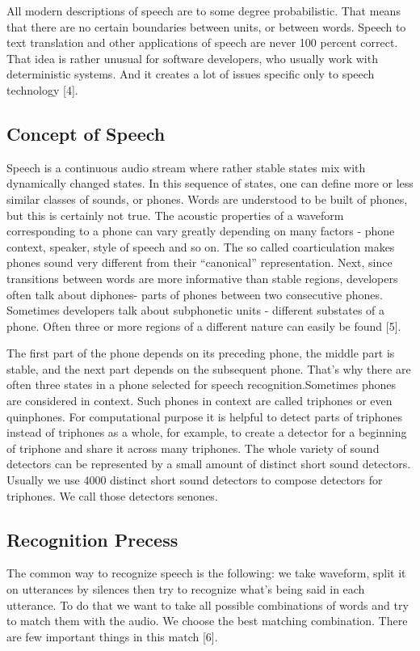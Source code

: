 \documentclass[12pt,a4paper,oneside]{memoir}
\begin{document}
All modern descriptions of speech are to some degree probabilistic. That means that there are no certain boundaries between units, or between words. Speech to text translation and other applications of speech are never 100 percent correct. That idea is rather unusual for software developers, who usually work with deterministic systems. And it creates a lot of issues specific only to speech technology [4]. 


\subsection{Concept of Speech}
Speech is a continuous audio stream where rather stable states mix with dynamically changed states. In this sequence of states, one can define more or less similar classes of sounds, or phones. Words are understood to be built of phones, but this is certainly not true. The acoustic properties of a waveform corresponding to a phone can vary greatly depending on many factors - phone context, speaker, style of speech and so on. The so called coarticulation makes phones sound very different from their “canonical” representation. Next, since transitions between words are more informative than stable regions, developers often talk about diphones- parts of phones between two consecutive phones. Sometimes developers talk about subphonetic units - different substates of a phone. Often three or more regions of a different nature can easily be found [5].

The first part of the phone depends on its preceding phone, the middle part is stable, and the next part depends on the subsequent phone. That's why there are often three states in a phone selected for speech recognition.Sometimes phones are considered in context. Such phones in context are called triphones or even quinphones. For computational purpose it is helpful to detect parts of triphones instead of triphones as a whole, for example, to create a detector for a beginning of triphone and share it across many triphones. The whole variety of sound detectors can be represented by a small amount of distinct short sound detectors. Usually we use 4000 distinct short sound detectors to compose detectors for triphones. We call those detectors senones. 


\subsection{Recognition Precess}
 The common way to recognize speech is the following: we take waveform, split it on utterances by silences then try to recognize what's being said in each utterance. To do that we want to take all possible combinations of words and try to match them with the audio. We choose the best matching combination. There are few important things in this match [6].
\end{document}
